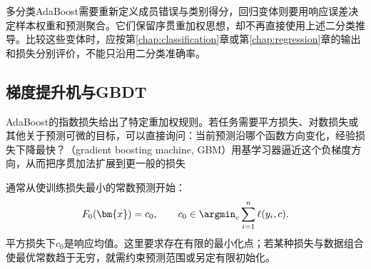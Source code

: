 多分类AdaBoost需要重新定义成员错误与类别得分，回归变体则要用响应误差决定样本权重和预测聚合。它们保留序贯重加权思想，却不再直接使用上述二分类推导。比较这些变体时，应按第\ref{chap:classification}章或第\ref{chap:regression}章的输出和损失分别评价，不能只沿用二分类准确率。

\subsection{梯度提升机与GBDT}
\label{sec:ensemble-gradient-boosting}

AdaBoost的指数损失给出了特定重加权规则。若任务需要平方损失、对数损失或其他关于预测可微的目标，可以直接询问：当前预测沿哪个函数方向变化，经验损失下降最快？（gradient boosting machine, GBM）用基学习器逼近这个负梯度方向，从而把序贯加法扩展到更一般的损失

通常从使训练损失最小的常数预测开始：
\begin{equation}
  F_0(\bm{x})=c_0,
  \qquad
  c_0\in\argmin_c\sum_{i=1}^{n}\ell(y_i,c).
  \label{eq:ensemble-gbm-initialization}
\end{equation}
平方损失下$c_0$是响应均值。这里要求存在有限的最小化点；若某种损失与数据组合使最优常数趋于无穷，就需约束预测范围或另定有限初始化。

